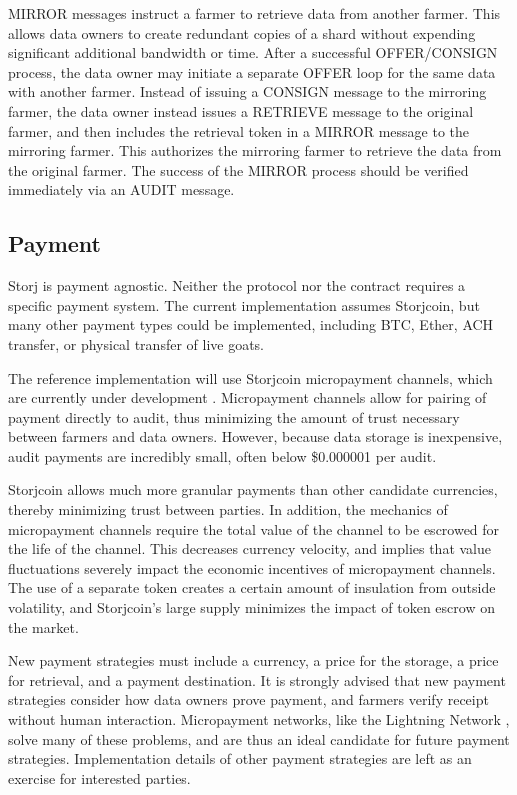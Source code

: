 \documentclass[a4paper,10pt]{article}
\begin{document}
MIRROR messages instruct a farmer to retrieve data from another farmer. This allows data owners to create redundant copies of a shard without expending significant additional bandwidth or time. After a successful OFFER/CONSIGN process, the data owner may initiate a separate OFFER loop for the same data with another farmer. Instead of issuing a CONSIGN message to the mirroring farmer, the data owner instead issues a RETRIEVE message to the original farmer, and then includes the retrieval token in a MIRROR message to the mirroring farmer. This authorizes the mirroring farmer to retrieve the data from the original farmer. The success of the MIRROR process should be verified immediately via an AUDIT message.

\subsection{Payment}
Storj is payment agnostic. Neither the protocol nor the contract requires a specific payment system. The current implementation assumes Storjcoin, but many other payment types could be implemented, including BTC, Ether, ACH transfer, or physical transfer of live goats.

The reference implementation will use Storjcoin micropayment channels, which are currently under development \cite{26}. Micropayment channels allow for pairing of payment directly to audit, thus minimizing the amount of trust necessary between farmers and data owners. However, because data storage is inexpensive, audit payments are incredibly small, often below \$0.000001 per audit.

Storjcoin allows much more granular payments than other candidate currencies, thereby minimizing trust between parties. In addition, the mechanics of micropayment channels require the total value of the channel to be escrowed for the life of the channel. This decreases currency velocity, and implies that value fluctuations severely impact the economic incentives of micropayment channels. The use of a separate token creates a certain amount of insulation from outside volatility, and Storjcoin's large supply minimizes the impact of token escrow on the market.

New payment strategies must include a currency, a price for the storage, a price for retrieval, and a payment destination. It is strongly advised that new payment strategies consider how data owners prove payment, and farmers verify receipt without human interaction. Micropayment networks, like the Lightning Network \cite{25}, solve many of these problems, and are thus an ideal candidate for future payment strategies. Implementation details of other payment strategies are left as an exercise for interested parties.
\end{document}
